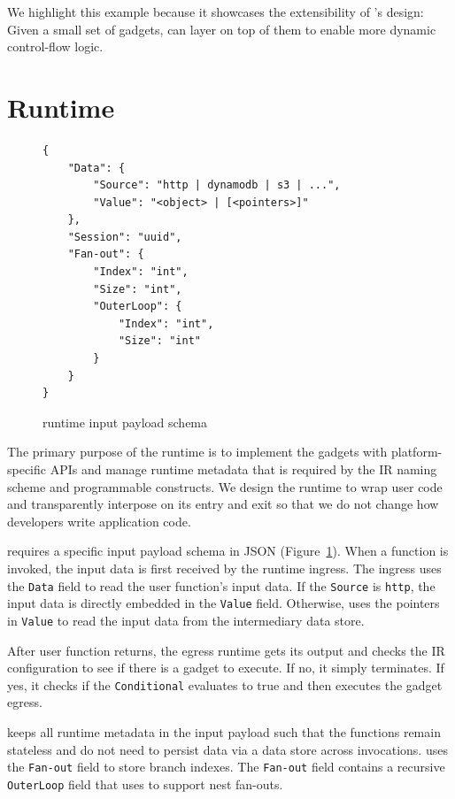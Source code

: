 We highlight this example because it showcases the extensibility of \name{}'s
design: Given a small set of gadgets, \name{} can layer on top of them to
enable more dynamic control-flow logic.


\section{Runtime}

\begin{figure}[]
    \begin{verbatim}
{
    "Data": {
        "Source": "http | dynamodb | s3 | ...",
        "Value": "<object> | [<pointers>]"
    },
    "Session": "uuid",
    "Fan-out": {
        "Index": "int",
        "Size": "int",
        "OuterLoop": {
            "Index": "int",
            "Size": "int"
        }
    }
}
    \end{verbatim}
    \caption{\name{} runtime input payload schema}
    \label{fig:input-format}
\end{figure}

The primary purpose of the \name{} runtime is to implement the gadgets with
platform-specific APIs and manage runtime metadata that is required by the
\name{} IR naming scheme and programmable constructs. We design the runtime to
wrap user code and transparently interpose on its entry and exit so that we do
not change how developers write application code.

 \name{} requires a specific input payload schema in JSON
(Figure~\ref{fig:input-format}). When a function is invoked, the input data is
first received by the runtime ingress. The ingress uses the \texttt{Data}
field to read the user function's input data. If the \texttt{Source} is
\texttt{http}, the input data is directly embedded in the \texttt{Value}
field. Otherwise, \name{} uses the pointers in \texttt{Value} to read the
input data from the intermediary data store.

After user function returns, the egress runtime gets its output and checks the
IR configuration to see if there is a gadget to execute. If no, it simply
terminates. If yes, it checks if the \texttt{Conditional} evaluates to true
and then executes the gadget egress.

\name{} keeps all runtime metadata in the input payload such that the
functions remain stateless and do not need to persist data via a data store
across invocations. \name{} uses the \texttt{Fan-out} field to store branch
indexes. The \texttt{Fan-out} field contains a recursive \texttt{OuterLoop}
field that \name{} uses to support nest fan-outs.

